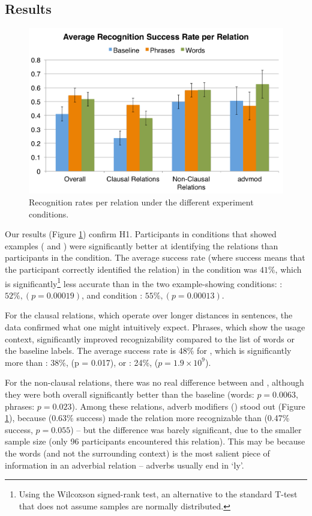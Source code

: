 \subsection{Results}
\begin{figure}
\centering
\includegraphics[width=\columnwidth]{fig/results}
\caption{\label{fig:results}Recognition rates per relation under the different experiment conditions.}
\end{figure}
Our results (Figure \ref{fig:results}) confirm H1. Participants in conditions that showed examples ( and ) were significantly better at identifying the relations than participants in the  condition.  The average success rate (where success means that the participant correctly identified the relation) in the  condition was $41\%$, which is significantly\footnote{Using the Wilcoxson signed-rank test, an alternative to the standard T-test that does not assume samples are normally distributed.} less accurate than in the two example-showing conditions: : $52\%, (p = 0.00019)$, and  condition : $55\%, (p = 0.00013)$.

For the clausal relations, which operate over longer distances in sentences, the data confirmed what one might intuitively expect. Phrases, which show the usage context, significantly improved recognizability compared to the list of words or the baseline labels. The average success rate is 48\% for , which is significantly more than : 38\%, (p = 0.017), or : 24\%, ($p= 1.9 \times 10^9$).

For the non-clausal relations, there was no real difference between  and , although they were both overall significantly better than the baseline (words: $p=0.0063$, phrases: $p=0.023$). Among these relations, adverb modifiers () stood out (Figure \ref{fig:results}), because  (0.63\% success) made the relation more recognizable than  (0.47\% success, $p = 0.055$) -- but the difference was barely significant, due to the smaller sample size (only 96 participants encountered this relation). This may be because the words (and not the surrounding context) is the most salient piece of information in an adverbial relation -- adverbs usually end in `ly'.

